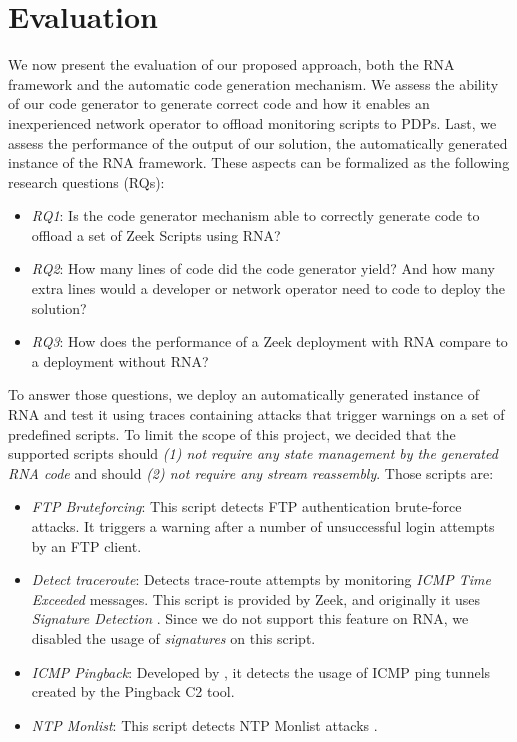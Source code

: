 
\section{Evaluation}
\label{sec:evaluation:evaluation}

We now present the evaluation of our proposed approach, both the RNA framework and the automatic code generation mechanism. We assess the ability of our code generator to generate correct code and how it enables an inexperienced network operator to offload monitoring scripts to PDPs. Last, we assess the performance of the output of our solution, the automatically generated instance of the RNA framework. These aspects can be formalized as the following research questions (RQs):

\begin{itemize}
    \item \textit{RQ1}: Is the code generator mechanism able to correctly generate code to offload a set of Zeek Scripts using RNA?
    
    \item \textit{RQ2}: How many lines of code did the code generator yield? And how many extra lines would a developer or network operator need to code to deploy the solution?
    
    \item \textit{RQ3}: How does the performance of a Zeek deployment with RNA compare to a deployment without RNA?
\end{itemize}

To answer those questions, we deploy an automatically generated instance of RNA and test it using traces containing attacks that trigger warnings on a set of predefined scripts. To limit the scope of this project, we decided that the supported scripts should \textit{(1) not require any state management by the generated RNA code} and should \textit{(2) not require any stream reassembly}. Those scripts are:

\begin{itemize}
    \item \textit{FTP Bruteforcing}: This script detects FTP authentication brute-force attacks. It triggers a warning after a number of unsuccessful login attempts by an FTP client.
    \item \textit{Detect traceroute}: Detects trace-route attempts by monitoring \textit{ICMP Time Exceeded} messages. This script is provided by Zeek, and originally it uses \textit{Signature Detection} \cite{ZeekSignatureFramework}. Since we do not support this feature on RNA, we disabled the usage of \textit{signatures} on this script.
    \item \textit{ICMP Pingback}: Developed by , it detects the usage of ICMP ping tunnels created by the Pingback C2 tool.
    \item \textit{NTP Monlist}: This script detects NTP Monlist attacks \cite{NtpMonlist}.
\end{itemize}


